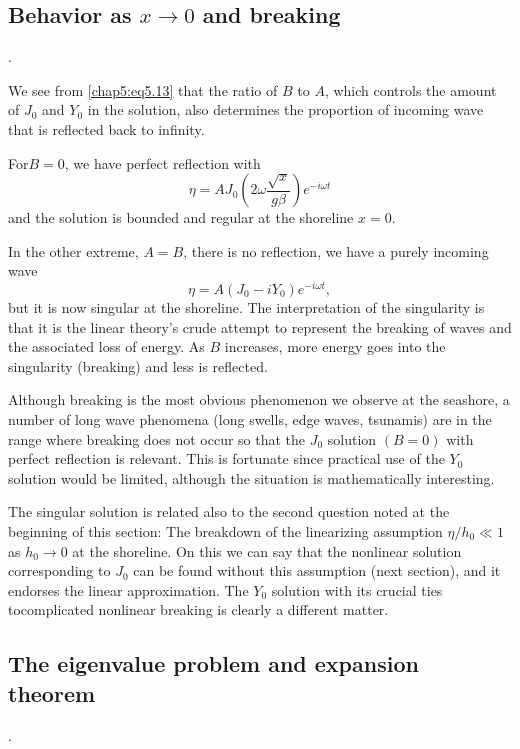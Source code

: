 \subsection*{\bf Behavior as $x\to 0$ and breaking}.

We see from \eqref{chap5:eq5.13} that the ratio of $B$ to $A$, which controls the amount of $J_0$ and $Y_0$ in the solution, also determines the proportion of incoming wave that is reflected back to infinity. 

For\pageoriginale $B=0$, we have perfect reflection with
\begin{equation}
\eta=AJ_0\left(2\omega\frac{\sqrt{x}}{g\beta}\right)e^{-i\omega t} \tag{5.16}\label{chap5:eq5.16}
\end{equation}
and the solution is bounded and regular at the shoreline $x=0$.

In the other extreme, $A=B$, there is no reflection, we have a purely incoming wave
\begin{equation}
\eta=A\left(J_0-iY_0\right)e^{-i\omega t},\tag{5.17}\label{chap5:eq5.17}
\end{equation}
but it is now singular at the shoreline. The interpretation of the singularity is that it is the linear theory's crude attempt to represent the breaking of waves and the associated loss of energy. As $B$ increases, more energy goes into the singularity (breaking) and less is reflected. 

Although breaking is the most obvious phenomenon we observe at the seashore, a number of long wave phenomena (long swells, edge waves, tsunamis) are in the range where breaking does not occur so that the $J_0$ solution $(B=0)$ with perfect reflection is relevant. This is fortunate since practical use of the $Y_0$ solution would be limited, although the situation is mathematically interesting.

The singular solution is related also to the second question noted at the beginning of this section: The breakdown of the linearizing assumption $\eta/h_0\ll 1$ as $h_0\to 0$ at the shoreline. On this we can say that the nonlinear solution corresponding to $J_0$ can be found without this assumption (next section), and it endorses the linear approximation. The $Y_0$ solution with its crucial ties to\pageoriginale complicated nonlinear breaking is clearly a different matter.

\subsection*{\bf The eigenvalue problem and expansion theorem}. 

